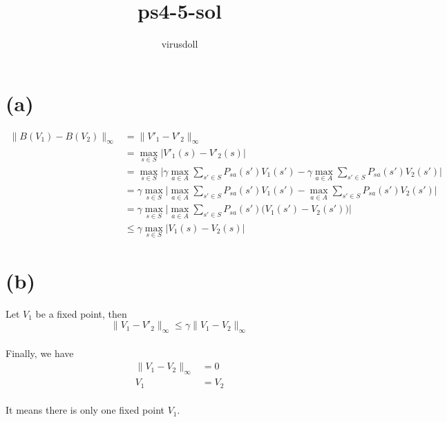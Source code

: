 \documentclass[11pt, a4paper]{article}
\title{ps4-5-sol}
\author{virusdoll}
\begin{document}
    \maketitle

    \section*{(a)}
    
    \begin{align*}
        \| B(V_1) - B(V_2) \| _\infty
        & = \| V'_1 - V'_2 \| _\infty \\
        & = \max_{s \in S} | V'_1(s) - V'_2(s) | \\
        & = \max_{s \in S} \Big|
            \gamma \max_{a \in A} \sum_{s' \in S} P_{sa}(s') V_1(s')
            - \gamma \max_{a \in A} \sum_{s' \in S} P_{sa}(s') V_2(s')
        \Big| \\
        & = \gamma \max_{s \in S} \Big|
            \max_{a \in A} \sum_{s' \in S} P_{sa}(s') V_1(s')
            - \max_{a \in A} \sum_{s' \in S} P_{sa}(s') V_2(s')
        \Big| \\
        & = \gamma \max_{s \in S} \Big|
            \max_{a \in A} \sum_{s' \in S} P_{sa}(s') \big( V_1(s') - V_2(s') \big)
        \Big| \\
        & \le \gamma \max_{s \in S} | V_1(s) - V_2(s) |
    \end{align*}

    \section*{(b)}
    Let $V_1$ be a fixed point, then
    $$\| V_1 - V'_2 \|_\infty \le \gamma \| V_1 - V_2 \|_\infty$$
    \\
    Finally, we have
    \begin{align*}
        \| V_1 - V_2 \|_\infty & = 0 \\
        V_1 & = V_2
    \end{align*}
    \\
    It means there is only one fixed point $V_1$.
\end{document}
